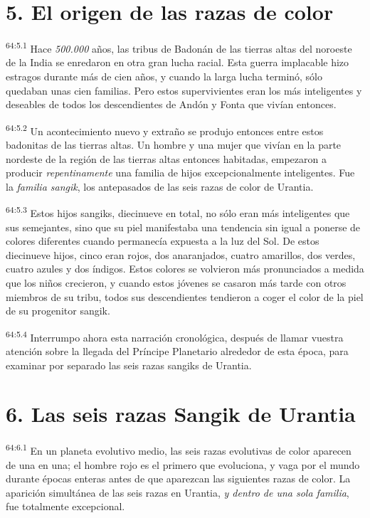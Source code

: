 \section*{5. El origen de las razas de color}
\par
\textsuperscript{64:5.1} Hace \textit{500.000} años, las tribus de Badonán de las tierras altas del noroeste de la India se enredaron en otra gran lucha racial. Esta guerra implacable hizo estragos durante más de cien años, y cuando la larga lucha terminó, sólo quedaban unas cien familias. Pero estos supervivientes eran los más inteligentes y deseables de todos los descendientes de Andón y Fonta que vivían entonces.

\par
\textsuperscript{64:5.2} Un acontecimiento nuevo y extraño se produjo entonces entre estos badonitas de las tierras altas. Un hombre y una mujer que vivían en la parte nordeste de la región de las tierras altas entonces habitadas, empezaron a producir \textit{repentinamente} una familia de hijos excepcionalmente inteligentes. Fue la \textit{familia sangik}, los antepasados de las seis razas de color de Urantia.

\par
\textsuperscript{64:5.3} Estos hijos sangiks, diecinueve en total, no sólo eran más inteligentes que sus semejantes, sino que su piel manifestaba una tendencia sin igual a ponerse de colores diferentes cuando permanecía expuesta a la luz del Sol. De estos diecinueve hijos, cinco eran rojos, dos anaranjados, cuatro amarillos, dos verdes, cuatro azules y dos índigos. Estos colores se volvieron más pronunciados a medida que los niños crecieron, y cuando estos jóvenes se casaron más tarde con otros miembros de su tribu, todos sus descendientes tendieron a coger el color de la piel de su progenitor sangik.

\par
\textsuperscript{64:5.4} Interrumpo ahora esta narración cronológica, después de llamar vuestra atención sobre la llegada del Príncipe Planetario alrededor de esta época, para examinar por separado las seis razas sangiks de Urantia.

\section*{6. Las seis razas Sangik de Urantia}
\par
\textsuperscript{64:6.1} En un planeta evolutivo medio, las seis razas evolutivas de color aparecen de una en una; el hombre rojo es el primero que evoluciona, y vaga por el mundo durante épocas enteras antes de que aparezcan las siguientes razas de color. La aparición simultánea de las seis razas en Urantia, \textit{y dentro de una sola familia}, fue totalmente excepcional.

